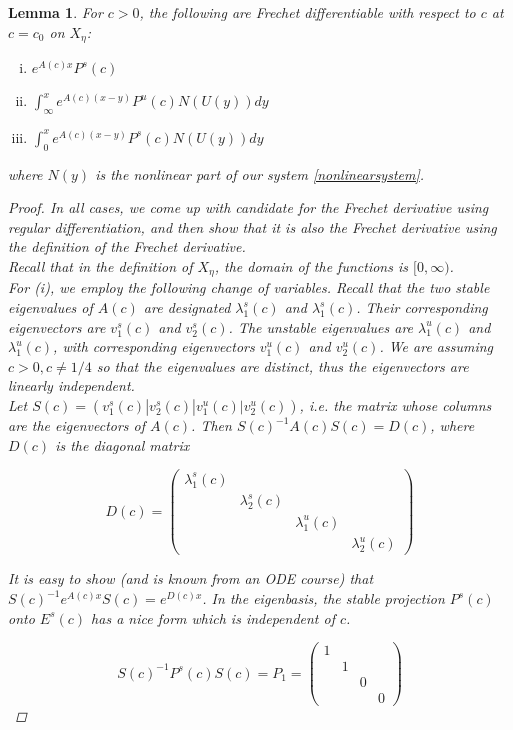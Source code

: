 \documentclass[12pt]{article}
\newtheorem{lemma}{Lemma}
\begin{document}
\begin{lemma}\label{derivatives2}
For $c > 0$, the following are Frechet differentiable with respect to $c$ at $c = c_0$ on $X_\eta$:
\begin{enumerate}[(i)]
	\item $e^{A(c)x} P^s(c)$
	\item $\int_\infty^x e^{A(c)(x - y)}P^u(c) N(U(y))dy$
	\item $\int_0^x e^{A(c)(x - y)}P^s(c) N(U(y))dy$
\end{enumerate}
where $N(y)$ is the nonlinear part of our system \eqref{nonlinearsystem}.

\begin{proof}
In all cases, we come up with candidate for the Frechet derivative using regular differentiation, and then show that it is also the Frechet derivative using the definition of the Frechet derivative.\\

Recall that in the definition of $X_\eta$, the domain of the functions is $[0, \infty)$.\\

For (i), we employ the following change of variables. Recall that the two stable eigenvalues of $A(c)$ are designated $\lambda^s_1(c)$ and $\lambda^s_1(c)$. Their corresponding eigenvectors are $v^s_1(c)$ and $v^s_2(c)$. The unstable eigenvalues are $\lambda^u_1(c)$ and $\lambda^u_1(c)$, with corresponding eigenvectors $v^u_1(c)$ and $v^u_2(c)$. We are assuming $c > 0, c \neq 1/4$ so that the eigenvalues are distinct, thus the eigenvectors are linearly independent. \\

Let $S(c) = (v^s_1(c) | v^s_2(c) | v^u_1(c) | v^u_2(c))$, i.e. the matrix whose columns are the eigenvectors of $A(c)$. Then $S(c)^{-1} A(c) S(c) = D(c)$, where $D(c)$ is the diagonal matrix

\[
D(c) = \begin{pmatrix}
\lambda^s_1(c) &&& \\ & \lambda^s_2(c)&& \\ && \lambda^u_1(c) & \\ &&& \lambda^u_2(c) 
\end{pmatrix}
\]

It is easy to show (and is known from an ODE course) that $S(c)^{-1} e^{A(c)x} S(c) = e^{D(c) x}$. In the eigenbasis, the stable projection $P^s(c)$ onto $E^s(c)$ has a nice form which is independent of $c$.

\[
S(c)^{-1} P^s(c) S(c) = P_1 = \begin{pmatrix}
1 &&& \\ & 1 && \\ && 0 & \\ &&& 0 
\end{pmatrix}
\]


\end{proof}
\end{lemma}
\end{document}
